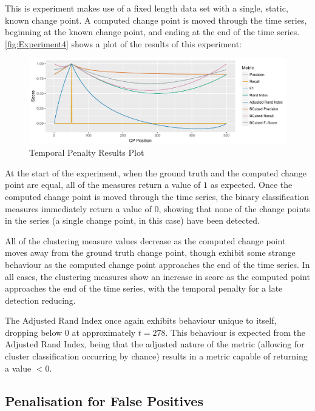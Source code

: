 \documentclass{uvamscse}	%
\begin{document}
This is experiment makes use of a fixed length data set with a single, static, known change point. A computed change point is moved through the time series, beginning at the known change point, and ending at the end of the time series. \autoref{fig:Experiment4} shows a plot of the results of this experiment:

\begin{figure}[h]
    \includegraphics[width=\textwidth]{figures/Experiment3}
    \caption{Temporal Penalty Results Plot}
    \label{fig:Experiment4}
\end{figure}

At the start of the experiment, when the ground truth and the computed change point are equal, all of the measures return a value of $1$ as expected. Once the computed change point is moved through the time series, the binary classification measures immediately return a value of $0$, showing that none of the change points in the series (a single change point, in this case) have been detected.

All of the clustering measure values decrease as the computed change point moves away from the ground truth change point, though exhibit some strange behaviour as the computed change point approaches the end of the time series. In all cases, the clustering measures show an increase in score as the computed point approaches the end of the time series, with the temporal penalty for a late detection reducing.

The Adjusted Rand Index once again exhibits behaviour unique to itself, dropping below $0$ at approximately $t=278$. This behaviour is expected from the Adjusted Rand Index, being that the adjusted nature of the metric (allowing for cluster classification occurring by chance) results in a metric capable of returning a value $<0$.

\subsection{Penalisation for False Positives}
\end{document}
